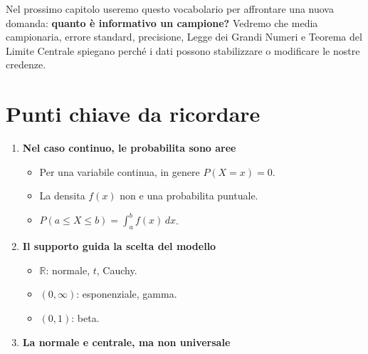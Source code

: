 \documentclass[
  italian,
  letterpaper,
  a4paper,
  11pt,
  open=any]{scrbook}
\providecommand{\tightlist}{%
  \setlength{\itemsep}{0pt}\setlength{\parskip}{0pt}}
\theoremstyle{plain}
\theoremstyle{definition}
\theoremstyle{definition}
\theoremstyle{remark}
\begin{document}
Nel prossimo capitolo useremo questo vocabolario per affrontare una
nuova domanda: \textbf{quanto è informativo un campione?} Vedremo che
media campionaria, errore standard, precisione, Legge dei Grandi Numeri
e Teorema del Limite Centrale spiegano perché i dati possono
stabilizzare o modificare le nostre credenze.

\section*{Punti chiave da ricordare}\label{punti-chiave-da-ricordare-11}


\begin{tcolorbox}[enhanced jigsaw, arc=.35mm, bottomrule=.15mm, bottomtitle=1mm, breakable, colback=white, colbacktitle=quarto-callout-important-color!10!white, colframe=quarto-callout-important-color-frame, coltitle=black, left=2mm, leftrule=.75mm, opacityback=0, opacitybacktitle=0.6, rightrule=.15mm, title=\textcolor{quarto-callout-important-color}{\faExclamation}\hspace{0.5em}{Importante}, titlerule=0mm, toprule=.15mm, toptitle=1mm]

\begin{enumerate}
\def\labelenumi{\arabic{enumi}.}
\tightlist
\item
  \textbf{Nel caso continuo, le probabilita sono aree}

  \begin{itemize}
  \tightlist
  \item
    Per una variabile continua, in genere \(P(X=x)=0\).
  \item
    La densita \(f(x)\) non e una probabilita puntuale.
  \item
    \(P(a \leq X \leq b)=\int_a^b f(x)\,dx\).
  \end{itemize}
\item
  \textbf{Il supporto guida la scelta del modello}

  \begin{itemize}
  \tightlist
  \item
    \(\mathbb{R}\): normale, \(t\), Cauchy.
  \item
    \((0,\infty)\): esponenziale, gamma.
  \item
    \((0,1)\): beta.
  \end{itemize}
\item
  \textbf{La normale e centrale, ma non universale}


\end{enumerate}
\end{tcolorbox}
\end{document}
